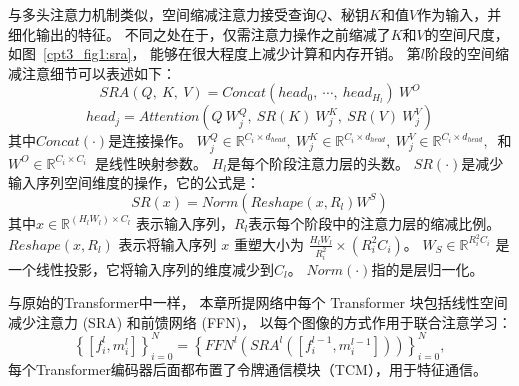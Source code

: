 与多头注意力机制类似，空间缩减注意力接受查询$Q$、秘钥$K$和值$V$作为输入，并细化输出的特征。
不同之处在于，仅需注意力操作之前缩减了$K$和$V$的空间尺度，如图~\ref{cpt3_fig1:sra}，
能够在很大程度上减少计算和内存开销。
第$l$阶段的空间缩减注意细节可以表述如下：
%
%
%
%
\begin{equation}
	SRA(Q,~K,~V) = Concat(head_{0},~ \cdots,~ head_{H_{l}})~W^{O}
\end{equation}
%
%
\begin{equation}
	head_{j} = Attention(Q~W_{j}^{Q}, ~ SR(K)~W_{j}^{K},~ SR(V)~W_{j}^{V})
\end{equation}
%
%
%
其中$Concat(\cdot)$是连接操作。
$W_{j}^{Q} \in \mathbb{R}^{C_{i} \times d_{head}},~
W_{j}^{K} \in \mathbb{R}^{C_{i} \times d_{head}},~
W_{j}^{V} \in \mathbb{R}^{C_{i} \times d_{head}},~$
和
$W^{O} \in \mathbb{R}^{C_{i} \times C_{i}}~$
是线性映射参数。
$H_{l}$是每个阶段注意力层的头数。
$SR(\cdot)$是减少输入序列空间维度的操作，它的公式是：
%
%
%
\begin{equation}
	SR(x) = Norm(Reshape(x, R_{l})W^{S})
\end{equation}
%
%
其中$x \in \mathbb{R}^{(H_{l}W_{l}) \times C_{l}} $
表示输入序列，$R_{l}$表示每个阶段中的注意力层的缩减比例。
$Reshape(x, R_{l})$ 表示将输入序列 $x$ 重塑大小为
$\frac{H_{l}W_{l}}{R_{i}^{2}} \times (R_{i}^{2}C_{i})$。
$W_{S} \in \mathbb{R}^{R_{i}^{2}C_{i}}$
是一个线性投影，它将输入序列的维度减少到$C_{l}$。
$Norm(\cdot)$指的是层归一化。
%
%
\par
%
%
与原始的Transformer中一样，
本章所提网络中每个 Transformer 块包括线性空间减少注意力 (SRA) 和前馈网络 (FFN)，
以每个图像的方式作用于联合注意学习：
\begin{equation}
	\left \{ [f_{i}^{l}, m_{i}^{l}]\right \}_{i=0}^{N} = \left \{ FFN^{l} \left  ( SRA^{l} \left ( [f_{i}^{l-1}, m_{i}^{l-1}]\right )\right )\right \}_{i=0}^{N},
\end{equation}
每个Transformer编码器后面都布置了令牌通信模块（TCM），用于特征通信。 













